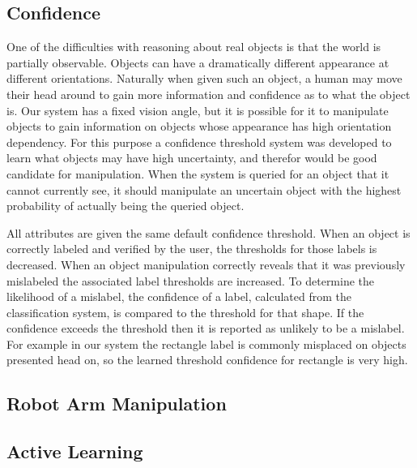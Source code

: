 \documentclass[11pt]{article}
\begin{document}
\subsection{Confidence}
One of the difficulties with reasoning about real objects is that the world is
partially observable. Objects can have a dramatically different appearance at
different orientations.  Naturally when given such an object, a human may move
their head around to gain more information and confidence as to what the object is.
Our system has a fixed vision angle, but it is possible for it to
manipulate objects to gain information on objects whose appearance has high
orientation dependency.  For this purpose a confidence threshold system was
developed to learn what objects may have high uncertainty, and therefor would
be good candidate for manipulation.  When the system is queried for an object
that it cannot currently see, it should manipulate an uncertain object with the
highest probability of actually being the queried object.

All attributes are given the same default confidence threshold.  When an object
is correctly labeled and verified by the user, the thresholds for those labels
is decreased.  When an object manipulation correctly reveals that it was
previously mislabeled the associated label thresholds are increased.  To
determine the likelihood of a mislabel, the confidence of a label, calculated
from the classification system, is compared to the threshold for that shape.
If the confidence exceeds the threshold then it is reported as unlikely to be a
mislabel.  For example in our system the rectangle label is commonly misplaced
on objects presented head on, so the learned threshold confidence for rectangle
is very high.

\subsection{Robot Arm Manipulation}

\subsection{Active Learning}
\end{document}
